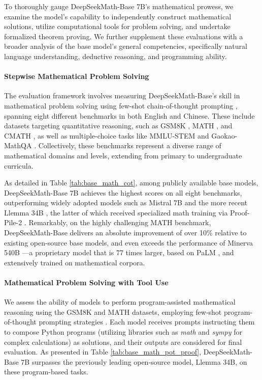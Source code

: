 To thoroughly gauge DeepSeekMath-Base 7B's mathematical prowess, we examine the model's capability to independently construct mathematical solutions, utilize computational tools for problem solving, and undertake formalized theorem proving. We further supplement these evaluations with a broader analysis of the base model's general competencies, specifically natural language understanding, deductive reasoning, and programming ability.

\paragraph{Stepwise Mathematical Problem Solving}

The evaluation framework involves measuring DeepSeekMath-Base's skill in mathematical problem solving using few-shot chain-of-thought prompting \citep{cot}, spanning eight different benchmarks in both English and Chinese. These include datasets targeting quantitative reasoning, such as GSM8K \citep{gsm8k}, MATH \citep{MATH}, and CMATH \citep{wei2023cmath}, as well as multiple-choice tasks like MMLU-STEM \citep{mmlu} and Gaokao-MathQA \citep{agieval}. Collectively, these benchmarks represent a diverse range of mathematical domains and levels, extending from primary to undergraduate curricula.

As detailed in Table \ref{tab:base_math_cot}, among publicly available base models, DeepSeekMath-Base 7B achieves the highest scores on all eight benchmarks, outperforming widely adopted models such as Mistral 7B \citep{mistral} and the more recent Llemma 34B \citep{llemma}, the latter of which received specialized math training via Proof-Pile-2 \citep{llemma}. Remarkably, on the highly challenging MATH benchmark, DeepSeekMath-Base delivers an absolute improvement of over 10\% relative to existing open-source base models, and even exceeds the performance of Minerva 540B \citep{minerva}—a proprietary model that is 77 times larger, based on PaLM \citep{palm}, and extensively trained on mathematical corpora.

\paragraph{Mathematical Problem Solving with Tool Use} We assess the ability of models to perform program-assisted mathematical reasoning using the GSM8K and MATH datasets, employing few-shot program-of-thought prompting strategies \citep{pot,pal}. Each model receives prompts instructing them to compose Python programs (utilizing libraries such as \textit{math} and \textit{sympy} for complex calculations) as solutions, and their outputs are considered for final evaluation. As presented in Table \ref{tab:base_math_pot_proof}, DeepSeekMath-Base 7B surpasses the previously leading open-source model, Llemma 34B, on these program-based tasks.

